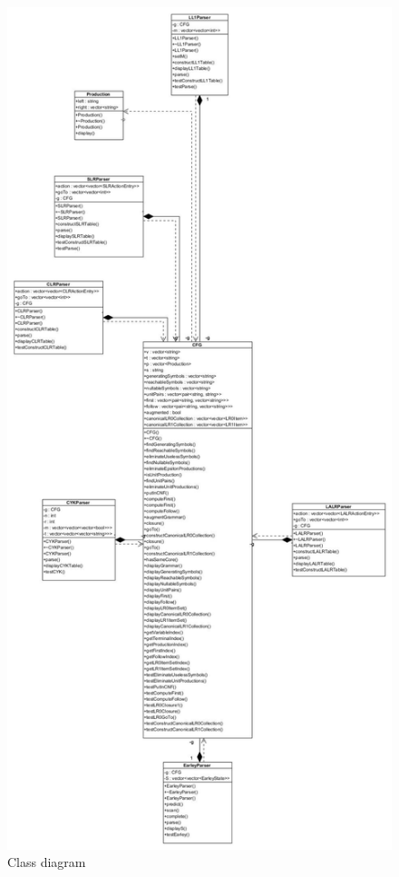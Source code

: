 \documentclass{beamer}
\begin{document}
   \begin{frame}
\begin{figure}
\includegraphics[height=0.8\textheight]{ClassDiagram.jpg}
\caption{Class diagram}
\label{fig: class}
\end{figure}
 \end{frame}
 
\end{document}
